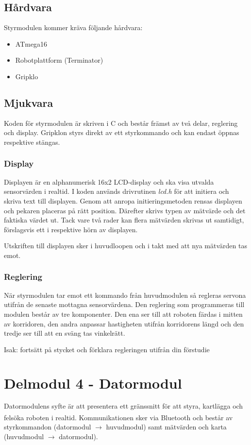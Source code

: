 \documentclass[11pt]{article}
\begin{document}
\begin{flushleft}
\subsection{Hårdvara}
Styrmodulen kommer kräva följande hårdvara:
\begin{itemize}
	\item ATmega16
	\item Robotplattform (Terminator)
	\item Gripklo %
\end{itemize}

\subsection{Mjukvara}
Koden för styrmodulen är skriven i C och består främst av två delar, reglering och display. Gripklon styrs direkt av ett styrkommando och kan endast öppnas respektive stängas.

\subsubsection{Display}
Displayen är en alphanumerisk 16x2 LCD-display och ska visa utvalda sensorvärden i realtid. I koden används drivrutinen \emph{lcd.h} för att initiera och skriva text till displayen. Genom att anropa initieringsmetoden rensas displayen och pekaren placeras på rätt position. Därefter skrivs typen av mätvärde och det faktiska värdet ut. Tack vare två rader kan flera mätvärden skrivas ut samtidigt, förslagsvis ett i respektive hörn av displayen.

Utskriften till displayen sker i huvudloopen och i takt med att nya mätvärden tas emot.

\subsubsection{Reglering} \label{mjukvarureglering}
När styrmodulen tar emot ett kommando från huvudmodulen så regleras servona utifrån de senaste mottagna sensorvärdena. Den reglering som programmeras till modulen består av tre komponenter. Den ena ser till att roboten färdas i mitten av korridoren, den andra anpassar hastigheten utifrån korridorens längd och den tredje ser till att en sväng tas vinkelrätt.

Isak: fortsätt på stycket och förklara regleringen utifrån din förstudie

\pagebreak
\section{Delmodul 4 - Datormodul}
Datormodulens syfte är att presentera ett gränssnitt för att styra, kartlägga och felsöka roboten i realtid. Kommunikationen sker via Bluetooth\textsuperscript{\circledR} och består av styrkommandon (datormodul $\rightarrow$ huvudmodul) samt mätvärden och karta (huvudmodul $\rightarrow$ datormodul). 


\end{flushleft}
\end{document}
